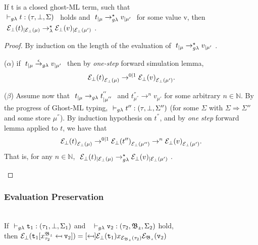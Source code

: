 \begin{theorem}
If t is a closed ghost-ML term, such that\\ 
$\typrule{t}{\tau}{\bot}{\Sigma}$ ~holds and $~t_{|\mu} \rightarrow_{g\lambda}^{\star} v_{|\mu'} ~$ 
for some value v, then\\ 
$~\mathcal{E}_{\bot}(t)_{|\mathcal{E}_{\bot}(\mu)} \rightarrow_{\lambda}^{\star} \mathcal{E}_{\bot}(v)_{|\mathcal{E}_{\bot}(\mu')} ~$.
\end{theorem}





\begin{proof}
By induction on the length of the evaluation of 
$~t_{|\mu} \rightarrow_{g\lambda}^{\star} v_{|\mu'} ~$.
\begin{adjustwidth}{1em}{-3em}

\noindent ($\alpha$) \quad 
 if $~t_{|\mu} \stackrel{\epsilon}{\rightarrow}_{g\lambda} v_{|\mu'} ~$ then 	
 by \textit{one-step} forward simulation lemma,\\ 
$${\mathcal{E}_{\bot}(t)}_{\mathcal{E}_{\bot}(\mu)} \rightarrow^{0|1} {\mathcal{E}_{\bot}(v)}_{\mathcal{E}_{\bot}(\mu')}.$$ 

\noindent ($\beta$) \quad Assume now that 
$~t_{|\mu} \rightarrow_{g\lambda} t^{''}_{|\mu^{''}} ~$ and  $t^{''}_{\mu^{''}} \rightarrow^{n} v_{\mu'}$
for some arbitrary $n \in \mathbb{N}$.
By the progress of Ghost-ML typing, 
$ \typrule{t''}{\tau}{\bot}{\Sigma''}$ (for some $\Sigma$ with $\Sigma \Rightarrow \Sigma''$ and some store $\mu^{''}$). By induction hypothesis 
on $t^{''}$, and by \textit{one step} forward lemma applied to $t$, 
we have that  
$${\mathcal{E}_{\bot}(t)}_{\mathcal{E}_{\bot}(\mu)} \rightarrow^{0|1} {\mathcal{E}_{\bot}(t'')}_{\mathcal{E}_{\bot}(\mu'')}
\rightarrow^{n} {\mathcal{E}_{\bot}(v)}_{\mathcal{E}_{\bot}(\mu')}.$$ That is, for any $n \in \mathbb{N}$, $~\mathcal{E}_{\bot}(t)_{|\mathcal{E}_{\bot}(\mu)} \rightarrow_{g\lambda}^{\star} \mathcal{E}_{\bot}(v)_{|\mathcal{E}_{\bot}(\mu')} ~$.
\end{adjustwidth}
\end{proof}




\subsubsection{Evaluation Preservation}
\begin{lemma} ~\\
If $\typrule
		{\texttt{t}_{1}}
		{\tau_{1}}
		{\bot}
		{\Sigma_1}$  
and 
	\mbox{
		$\typrule
			{\texttt{v}_{2}}
			{\tau_{2}}
			{\mf{B_{2}}}
			{\Sigma_2}$}	
hold, \\ 
then
$\e_{\bot}
	(\sbst
		{\texttt{t}_{1}}
		{x^{\mf{B_{2}}}_{\tau_{2}}}
		{\texttt{v}_{2}})
= \sbst
		{\e_{\bot}(\texttt{t}_{1})}
		{x_{\e_{\mf{B_{2}}}(\tau_{2})}}
		{\e_{\mf{B_{2}}}(\texttt{v}_{2})}$
\label{Substitution under erasure}
\end{lemma}

